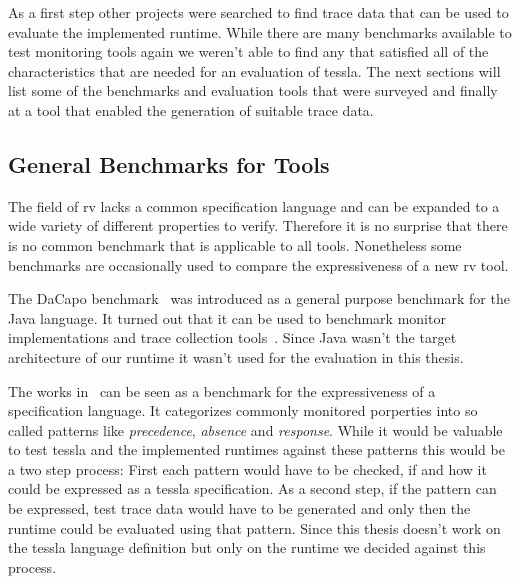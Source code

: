As a first step other projects were searched to find trace data that can be used to evaluate the implemented runtime.
While there are many benchmarks available to test monitoring tools again we weren't able to find any that satisfied all of the characteristics that are needed for an evaluation of \gls{tessla}.
The next sections will list some of the benchmarks and evaluation tools that were surveyed and finally at a tool that enabled the generation of suitable trace data.

\subsection{General Benchmarks for  Tools}

The field of \gls{rv} lacks a common specification language and can be expanded to a wide variety of different properties to verify.
Therefore it is no surprise that there is no common benchmark that is applicable to all tools.
Nonetheless some benchmarks are occasionally used to compare the expressiveness of a new \gls{rv} tool.

The DaCapo benchmark~\citep{Blackburn2006} was introduced as a general purpose benchmark for the Java language.
It turned out that it can be used to benchmark monitor implementations and trace collection tools~\citep{Wu2016,Chen2007,Marek2012}.
Since Java wasn't the target architecture of our runtime it wasn't used for the evaluation in this thesis.

The works in~\cite{Dwyer1999} can be seen as a benchmark for the expressiveness of a specification language.
It categorizes commonly monitored porperties into so called patterns like \emph{precedence}, \emph{absence} and \emph{response}.
While it would be valuable to test \gls{tessla} and the implemented runtimes against these patterns this would be a two step process:
First each pattern would have to be checked, if and how it could be expressed as a \gls{tessla} specification.
As a second step, if the pattern can be expressed, test trace data would have to be generated and only then the runtime could be evaluated using that pattern.
Since this thesis doesn't work on the \gls{tessla} language definition but only on the runtime we decided against this process.

